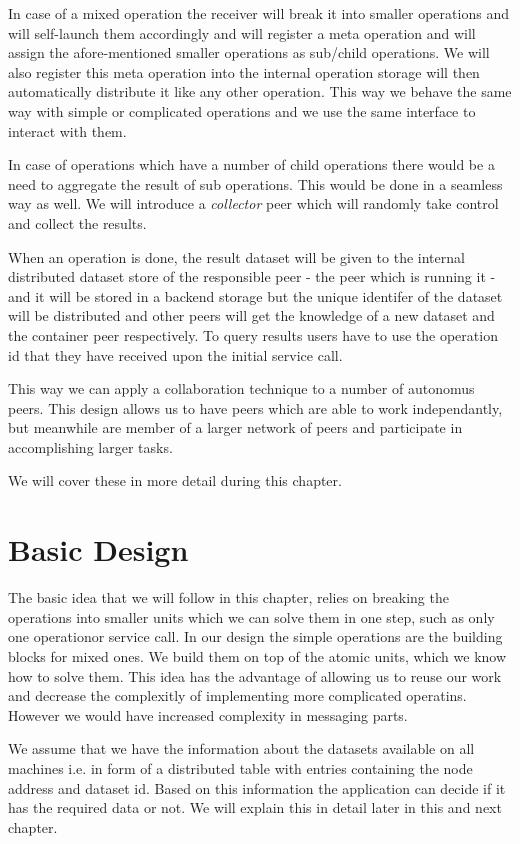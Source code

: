 In case of a mixed operation the receiver will break it into smaller operations and will self-launch them accordingly and
will register a meta operation and will assign the afore-mentioned smaller operations as sub/child operations. We will
also register this meta operation into the internal operation storage will then automatically distribute it like any other
operation. This way we behave the same way with simple or complicated operations and we use the same interface to interact
with them.

In case of operations which have a number of child operations there would be a need to aggregate the result of sub operations.
This would be done in a seamless way as well. We will introduce a \textit{collector} peer which will randomly take control
and collect the results.

When an operation is done, the result dataset will be given to the internal distributed dataset store of the responsible
peer - the peer which is running it - and it will be stored in a backend storage but the unique identifer of the dataset
will be distributed and other peers will get the knowledge of a new dataset and the container peer respectively. 
To query results users have to use the operation id that they have received upon the initial service call. 

This way we can apply a collaboration technique to a number of autonomus peers. 
This design allows us to have peers which are able to work independantly, 
but meanwhile are member of a larger network of peers and participate in accomplishing larger tasks.

We will cover these in more detail during this chapter.

\section{Basic Design}
The basic idea that we will follow in this chapter, relies on breaking the operations into smaller units which
we can solve them in one step, such as only one operationor service call. 
In our design the simple operations are the building blocks for mixed ones.
We build them on top of the atomic units, which we know how to solve them.
This idea has the advantage of allowing us to reuse our work and decrease the complexitly of implementing
more complicated operatins. However we would have increased complexity in messaging parts.

We assume that we have the information about the datasets
available on all machines i.e. in form of a distributed table
with entries containing the node address and dataset id. Based on this
information the application can decide if it has the required data or
not. We will explain this in detail later in this and next chapter.

